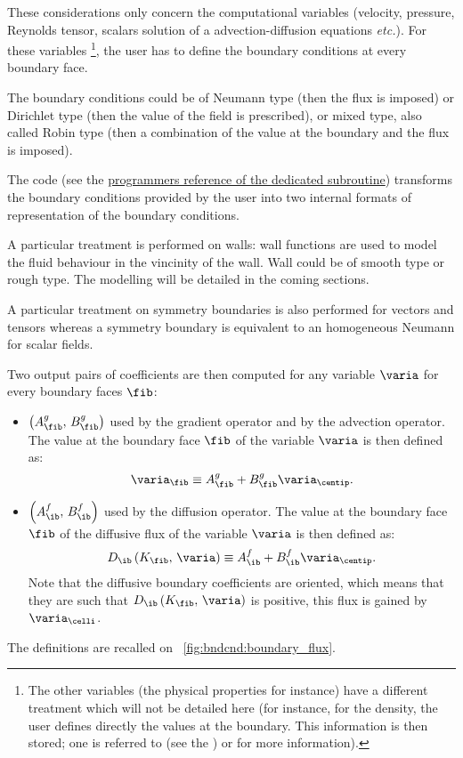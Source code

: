 These considerations only concern the computational variables  
(velocity, pressure, Reynolds tensor, 
scalars solution of a advection-diffusion equations \emph{etc.}). For these variables
\footnote{
The other variables 
(the physical properties for instance) have a different treatment which will 
not be detailed here (for instance, for the density, the user defines 
directly the values at the boundary. This information is then stored; one 
is referred to  (see the )
 or  for more information).
},
the user has to define the boundary conditions at every boundary face.

The boundary conditions could be of Neumann type (then the flux is imposed)
or Dirichlet type (then the value of the field is prescribed), or mixed type, also 
called Robin type (then a combination of the value at the boundary and the flux
is imposed).

The code (see the \href{../../../doxygen/src/html/condli_8f90.html}{programmers reference of the dedicated subroutine})
 transforms the boundary conditions provided by the user
 into two internal formats of representation of the boundary 
 conditions. 
 
 A particular treatment is performed on walls:
 wall functions are used to model the fluid behaviour in the vincinity of the wall.
 Wall could be of smooth type or rough type. The modelling will be detailed in the
 coming sections.
 
A particular treatment on symmetry boundaries is also performed for vectors and tensors
whereas a symmetry boundary is equivalent to an homogeneous Neumann for scalar fields.

Two output pairs of coefficients are then computed for any variable $\varia$ for every boundary faces $\fib$:

\begin{itemize}
\item $\left( A^g_\fib , \, B^g_\fib\right)$ used by the gradient operator and by the advection operator. 
The value at the boundary face $\fib$ of the variable $\varia$ is 
then defined as:
\begin{equation}\label{eq:bndcnd:coef_g_def}
\varia_\fib \equiv A^g_\fib + B^g_\fib \varia_\centip.
\end{equation}
%
\item $\left( A^f_\ib , \, B^f_\ib\right)$ used by the diffusion operator.
The value at the boundary face $\fib$ of the diffusive flux of the variable $\varia$ 
is then defined as:
\begin{equation}\label{eq:bndcnd:coef_f_def}
D_\ib \left( K_\fib , \, \varia \right) \equiv A^f_\ib + B^f_\ib  \varia_\centip.
\end{equation}
Note that the diffusive boundary coefficients are oriented, which means that they are such that $D_\ib \left( K_\fib , \, \varia \right) $ is positive, 
this flux is gained by $\varia_\celli$.
\end{itemize}
The definitions are recalled on \figurename~\ref{fig:bndcnd:boundary_flux}.

